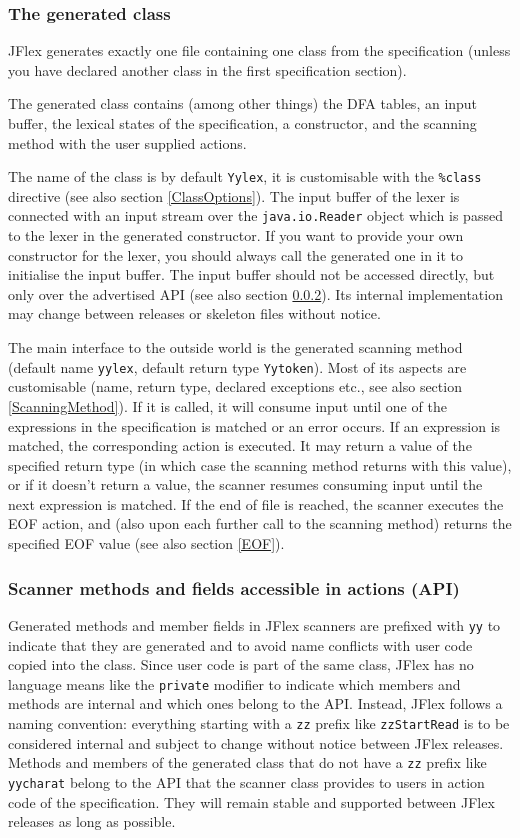 \documentclass[11pt]{scrartcl}
\begin{document}
\subsubsection{The generated class}
JFlex generates exactly one file containing one class from the specification
(unless you have declared another class in the first specification section).

The generated class contains (among other things) the DFA tables, an input buffer, 
the lexical states of the specification, a constructor, and the scanning method
with the user supplied actions.

The name of the class is by default \texttt{Yylex}, it is customisable
with the \texttt{\%class} directive (see also section
\ref{ClassOptions}). The input buffer of the lexer is connected with an
input stream over the \texttt{java.io.Reader} object which is passed
to the lexer in the generated constructor. If you want to provide your
own constructor for the lexer, you should always call the generated
one in it to initialise the input buffer. The input buffer should not
be accessed directly, but only over the advertised API (see also
section \ref{ScannerMethods}). Its internal implementation may change
between releases or skeleton files without notice.

The main interface to the outside world is the generated scanning
method (default name \texttt{yylex}, default return type
\texttt{Yytoken}). Most of its aspects are customisable (name, return
type, declared exceptions etc., see also section
\ref{ScanningMethod}).  If it is called, it will consume input until
one of the expressions in the specification is matched or an error
occurs. If an expression is matched, the corresponding action is
executed. It may return a value of the specified return type (in which
case the scanning method returns with this value), or if it doesn't
return a value, the scanner resumes consuming input until the next
expression is matched. If the end of file is reached, the scanner
executes the EOF action, and (also upon each further call to the scanning
method) returns the specified EOF value (see also section \ref{EOF}).


\subsubsection{Scanner methods and fields accessible in actions (API)}\label{ScannerMethods}
Generated methods and member fields in JFlex scanners are prefixed
with \texttt{yy} to indicate that they are generated and to avoid name
conflicts with user code copied into the class. Since user code is
part of the same class, JFlex has no language means like the
\texttt{private} modifier to indicate which members and methods are
internal and which ones belong to the API. Instead, JFlex follows a
naming convention: everything starting with a \texttt{zz} prefix like
\texttt{zzStartRead} is to be considered internal and subject to
change without notice between JFlex releases. Methods and members of
the generated class that do not have a \texttt{zz} prefix like
\texttt{yycharat} belong to the API that the scanner class provides to
users in action code of the specification. They will remain stable
and supported between JFlex releases as long as possible.
\end{document}

